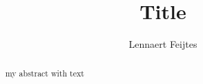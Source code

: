 \documentclass[twoside]{uva-inf-bachelor-thesis}
\title{Title}
\author{Lennaert Feijtes}
\begin{document}
\maketitle

\begin{abstract}
my abstract with text
\end{abstract}

\tableofcontents






\end{document}
